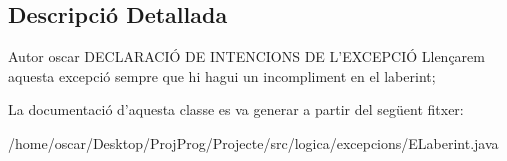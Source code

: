 \subsection{Descripció Detallada}
\begin{DoxyAuthor}{Autor}
oscar D\+E\+C\+L\+A\+R\+A\+C\+IÓ D\+E I\+N\+T\+E\+N\+C\+I\+O\+N\+S D\+E L'E\+X\+C\+E\+P\+C\+IÓ Llençarem aquesta excepció sempre que hi hagui un incompliment en el laberint; 
\end{DoxyAuthor}


La documentació d'aquesta classe es va generar a partir del següent fitxer\+:\begin{DoxyCompactItemize}
\item 
/home/oscar/\+Desktop/\+Proj\+Prog/\+Projecte/src/logica/excepcions/E\+Laberint.\+java\end{DoxyCompactItemize}
